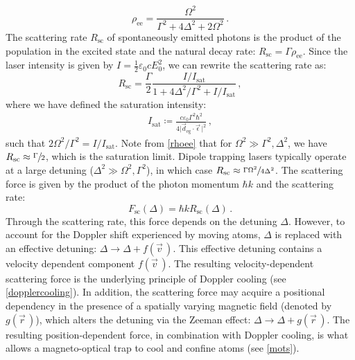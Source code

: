 \documentclass[../Thesis-IJspeert.tex]{subfiles}
\begin{document}
\begin{equation}
\label{rhoee}
{\rho}_\mathrm{ee}=\frac{\Omega^2}{\Gamma^2+4\Delta^2+2\Omega^2}\,.
\end{equation}
The scattering rate $R_\mathrm{sc}$ of spontaneously emitted photons is the product of the population in the excited state and the natural decay rate: $R_\mathrm{sc}=\Gamma \rho_\mathrm{ee}$. Since the laser intensity is given by $I=\frac{1}{2}\varepsilon_0 c E_0^2$, we can rewrite the scattering rate as:
\begin{equation}
\label{scatter}
R_\mathrm{sc}=\frac{\Gamma}{2}\frac{{I}/{I_\mathrm{sat}}}{1+{4\Delta^2}/{\Gamma^2}+{I}/{I_\mathrm{sat}}}\,,
\end{equation}
where we have defined the saturation intensity:
\begin{align}
I_\mathrm{sat}\coloneqq\frac{c\varepsilon_0\Gamma^2\hbar^2}{4\lvert \vec{d}_\mathrm{eg}\cdot\vec{\epsilon}\, \rvert^2}\,,
\end{align}
such that $2\Omega^2/\Gamma^2=I/I_\mathrm{sat}$. Note from \autoref{rhoee} that for $\Omega^2\gg\Gamma^2,\Delta^2$, we have $R_\mathrm{sc}\approx\sfrac{\Gamma}{2}$, which is the saturation limit. Dipole trapping lasers typically operate at a large detuning ($\Delta^2\gg\Omega^2,\Gamma^2$), in which case $R_\mathrm{sc}\approx\sfrac{\Gamma\Omega^2}{4\Delta^2}$. The scattering force is given by the product of the photon momentum $\hbar k$ and the scattering rate:
\begin{equation}
F_\mathrm{sc}(\Delta)=\hbar kR_\mathrm{sc}(\Delta)\,.
\end{equation}
Through the scattering rate, this force depends on the detuning $\Delta$. However, to account for the Doppler shift experienced by moving atoms, $\Delta$ is replaced with an effective detuning: $\Delta \rightarrow \Delta + f(\vec{v}\,)$. This effective detuning contains a velocity dependent component $f(\vec{v}\,)$. The resulting velocity-dependent scattering force is the underlying principle of Doppler cooling (see \autoref{dopplercooling}). In addition, the scattering force may acquire a positional dependency in the presence of a spatially varying magnetic field (denoted by $g(\vec{r}\,)$), which alters the detuning via the Zeeman effect: $\Delta \rightarrow \Delta + g(\vec{r}\,)$. The resulting position-dependent force, in combination with Doppler cooling, is what allows a magneto-optical trap to cool and confine atoms (see \autoref{mots}).
\end{document}

